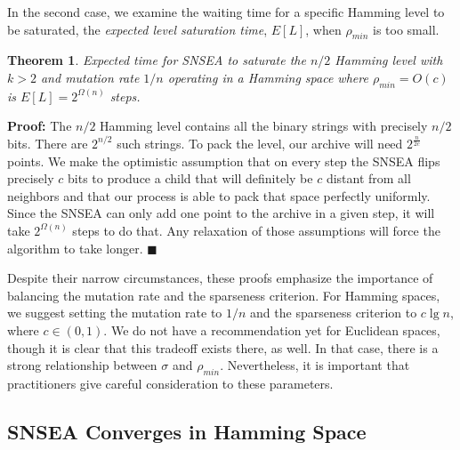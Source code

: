 \documentclass[twoside]{article}
\newtheorem{theorem}{Theorem}
\begin{document}
In the second case, we examine the waiting time for a specific Hamming level to be saturated, the \emph{expected level saturation time}, $E[L]$, when $\rho_{min}$ is too small.

\begin{theorem}
Expected time for SNSEA to saturate the $n/2$ Hamming level with $k>2$ and mutation rate $1/n$ operating in a Hamming space where $\rho_{min} = O(c)$ is $E[L] = 2^{\Omega(n)}$ steps.
\end{theorem}
\textbf{Proof:} The $n/2$ Hamming level contains all the binary strings with precisely $n/2$ bits.  There are $2^{n/2}$ such strings.  To pack the level, our archive will need $2^\frac{n}{2c}$ points.  We make the optimistic assumption that on every step the SNSEA flips precisely $c$ bits to produce a child that will definitely be $c$ distant from all neighbors and that our process is able to pack that space perfectly uniformly.  Since the SNSEA can only add one point to the archive in a given step, it will take $2^{\Omega(n)}$ steps to do that. Any relaxation of those assumptions will force the algorithm to take longer. $\blacksquare$

\vspace*{1ex}

Despite their narrow circumstances, these proofs emphasize the importance of balancing the mutation rate and the sparseness criterion.  For Hamming spaces, we suggest setting the mutation rate to $1/n$ and the sparseness criterion to $c\lg n$, where $c\in (0,1)$.  We do not have a recommendation yet for Euclidean spaces, though it is clear that this tradeoff exists there, as well.  In that case, there is a strong relationship between $\sigma$ and $\rho_{min}$.  Nevertheless, it is important that practitioners give careful consideration to these parameters.


\subsection{SNSEA Converges in Hamming Space}
\label{subsec:hamming}
\end{document}
